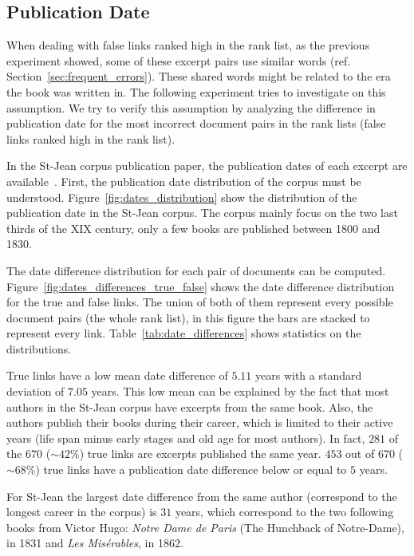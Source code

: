\subsection{Publication Date}

When dealing with false links ranked high in the rank list, as the previous experiment showed, some of these excerpt pairs use similar words (ref. Section~\ref{sec:frequent_errors}).
These shared words might be related to the era the book was written in.
The following experiment tries to investigate on this assumption.
We try to verify this assumption by analyzing the difference in publication date for the most incorrect document pairs in the rank lists (false links ranked high in the rank list).

In the St-Jean corpus publication paper, the publication dates of each excerpt are available~\cite{st_jean}.
First, the publication date distribution of the corpus must be understood.
Figure~\ref{fig:dates_distribution} show the distribution of the publication date in the St-Jean corpus.
The corpus mainly focus on the two last thirds of the XIX century, only a few books are published between 1800 and 1830.

The date difference distribution for each pair of documents can be computed.
Figure~\ref{fig:dates_differences_true_false} shows the date difference distribution for the true and false links.
The union of both of them represent every possible document pairs (the whole rank list), in this figure the bars are stacked to represent every link.
Table~\ref{tab:date_differences} shows statistics on the distributions.

True links have a low mean date difference of $5.11$ years with a standard deviation of $7.05$ years.
This low mean can be explained by the fact that most authors in the St-Jean corpus have excerpts from the same book.
Also, the authors publish their books during their career, which is limited to their active years (life span minus early stages and old age for most authors).
In fact, $281$ of the $670$ ($\sim 42\%$) true links are excerpts published the same year.
$453$ out of $670$ ($\sim 68\%$) true links have a publication date difference below or equal to $5$ years.

For St-Jean the largest date difference from the same author (correspond to the longest career in the corpus) is $31$ years, which correspond to the two following books from Victor Hugo: \textit{Notre Dame de Paris} (The Hunchback of Notre-Dame), in 1831 and \textit{Les Misérables}, in 1862.

